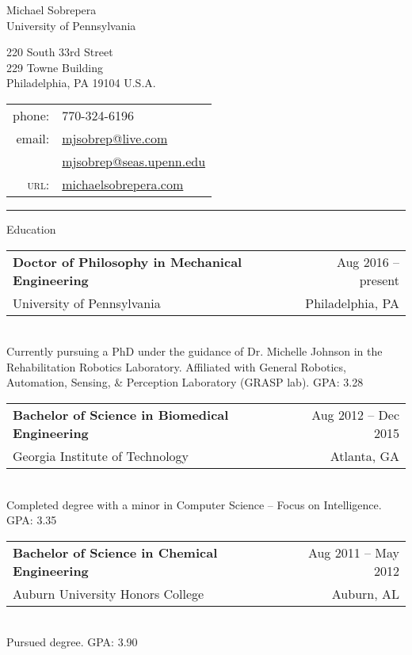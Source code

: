\documentclass[10pt, letter]{article}
\makeatletter
\newenvironment{cvsection}[1]{
    {\Large #1}
    \vspace{.1cm}
    
}{
}
\newcommand{\cvitem}[6]{
    \strut\hfill\begin{minipage}{\dimexpr\textwidth-1cm}
    \begin{tabular*}{\linewidth}{@{}l@{\extracolsep{\fill}}r@{}}
        \textbf{#1} & #4 -- #5\\
        #2 & #3\\
    \end{tabular*}\\[.05cm]
    #6
    \end{minipage}
    \vspace{.3cm}
}
\makeatother
\begin{document}
\begin{center}
{\LARGE Michael Sobrepera}\\[.5cm]
University of Pennsylvania\\
\begin{minipage}[c]{.35\textwidth}
220 South 33rd Street\\
229 Towne Building\\
Philadelphia, PA 19104 U.S.A.\\[.2cm]
\end{minipage}
\begin{minipage}[c]{.35\textwidth}
\begin{tabular}{r l}
phone: & 770-324-6196\\
email: & \href{mailto:mjsobrep@live.com}{mjsobrep@live.com}\\
       & \href{mailto:mjsobrep@seas.upenn.edu}{mjsobrep@seas.upenn.edu}\\
\textsc{url}: & \href{michaelsobrepera.com}{michaelsobrepera.com}\\ 
\end{tabular}
\end{minipage}
\end{center}
\hrule
\vspace{.4cm}

\begin{cvsection}{Education}
    \cvitem{Doctor of Philosophy in Mechanical Engineering}{University of Pennsylvania}{Philadelphia, PA}{Aug 2016}{present}{Currently pursuing a PhD under the guidance of Dr. Michelle Johnson in the Rehabilitation Robotics Laboratory. Affiliated with General Robotics, Automation, Sensing, \& Perception Laboratory (GRASP lab). GPA: 3.28}

    \cvitem{Bachelor of Science in Biomedical Engineering}{Georgia Institute of Technology}{Atlanta, GA}{Aug 2012}{Dec 2015}{Completed degree with a minor in Computer Science – Focus on Intelligence. GPA: 3.35}

    \cvitem{Bachelor of Science in Chemical Engineering}{Auburn University Honors College}{Auburn, AL}{Aug 2011}{May 2012}{Pursued degree. GPA: 3.90}
\end{cvsection}
\end{document}
